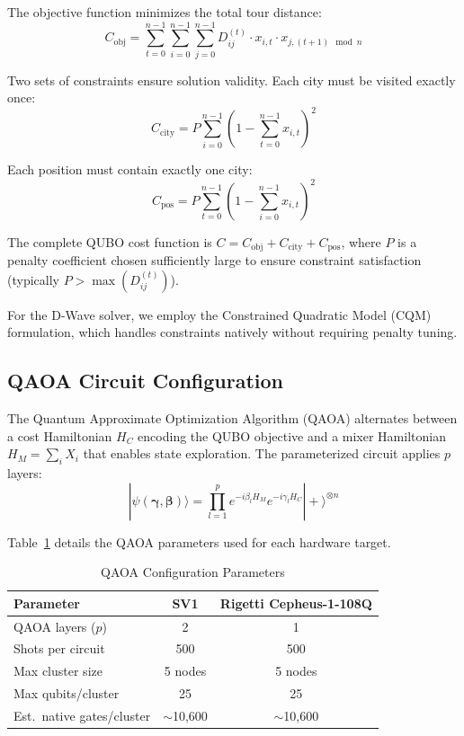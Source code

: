 \documentclass[conference]{IEEEtran}
\begin{document}
The objective function minimizes the total tour distance:
\begin{equation}
C_{\text{obj}} = \sum_{t=0}^{n-1} \sum_{i=0}^{n-1} \sum_{j=0}^{n-1} D_{ij}^{(t)} \cdot x_{i,t} \cdot x_{j,(t+1) \mod n}
\label{eq:qubo_obj}
\end{equation}

Two sets of constraints ensure solution validity. Each city must be visited exactly once:
\begin{equation}
C_{\text{city}} = P \sum_{i=0}^{n-1} \left(1 - \sum_{t=0}^{n-1} x_{i,t}\right)^2
\label{eq:city_constraint}
\end{equation}

Each position must contain exactly one city:
\begin{equation}
C_{\text{pos}} = P \sum_{t=0}^{n-1} \left(1 - \sum_{i=0}^{n-1} x_{i,t}\right)^2
\label{eq:pos_constraint}
\end{equation}

The complete QUBO cost function is $C = C_{\text{obj}} + C_{\text{city}} + C_{\text{pos}}$, where $P$ is a penalty coefficient chosen sufficiently large to ensure constraint satisfaction (typically $P > \max(D_{ij}^{(t)})$).

For the D-Wave solver, we employ the Constrained Quadratic Model (CQM) formulation, which handles constraints natively without requiring penalty tuning.

\subsection{QAOA Circuit Configuration}

The Quantum Approximate Optimization Algorithm (QAOA) alternates between a cost Hamiltonian $H_C$ encoding the QUBO objective and a mixer Hamiltonian $H_M = \sum_i X_i$ that enables state exploration. The parameterized circuit applies $p$ layers:
\begin{equation}
|\psi(\boldsymbol{\gamma}, \boldsymbol{\beta})\rangle = \prod_{l=1}^{p} e^{-i\beta_l H_M} e^{-i\gamma_l H_C} |+\rangle^{\otimes n}
\label{eq:qaoa}
\end{equation}

Table~\ref{tab:qaoa_params} details the QAOA parameters used for each hardware target.

\begin{table}[htbp]
\caption{QAOA Configuration Parameters}
\begin{center}
\begin{tabular}{|l|c|c|}
\hline
\textbf{Parameter} & \textbf{SV1} & \textbf{Rigetti Cepheus-1-108Q} \\
\hline
QAOA layers ($p$) & 2 & 1 \\
\hline
Shots per circuit & 500 & 500 \\
\hline
Max cluster size & 5 nodes & 5 nodes \\
\hline
Max qubits/cluster & 25 & 25 \\
\hline
Est.\ native gates/cluster & $\sim$10{,}600 & $\sim$10{,}600 \\
\hline
\end{tabular}
\label{tab:qaoa_params}
\end{center}
\end{table}
\end{document}
